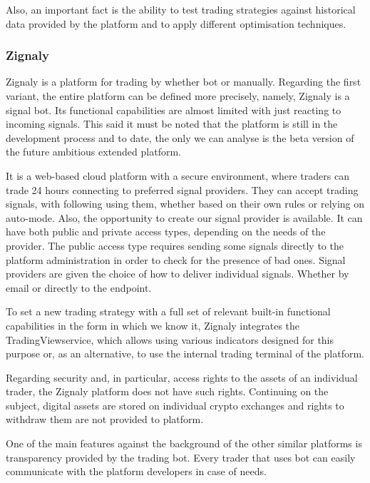 \documentclass[thesis=B,english]{FITthesis}[2019/03/06]
\begin{document}
Also, an important fact is the ability to test trading strategies against historical data provided by the platform and to apply different optimisation techniques.

\subsubsection{Zignaly}
Zignaly is a platform for trading by whether bot or manually. Regarding the first variant, the entire platform can be defined more precisely, namely, Zignaly is a signal bot. Its functional capabilities are almost limited with just reacting to incoming signals. This said it must be noted that the platform is still in the development process and to date, the only we can analyse is the beta version of the future ambitious extended platform.

It is a web-based cloud platform with a secure environment, where traders can trade 24 hours connecting to preferred signal providers. They can accept trading signals, with following using them, whether based on their own rules or relying on auto-mode. Also, the opportunity to create our signal provider is available. It can have both public and private access types, depending on the needs of the provider. The public access type requires sending some signals directly to the platform administration in order to check for the presence of bad ones. Signal providers are given the choice of how to deliver individual signals. Whether by email or directly to the endpoint.

To set a new trading strategy with a full set of relevant built-in functional capabilities in the form in which we know it, Zignaly integrates the TradingView\footnotemark service, which allows using various indicators designed for this purpose or, as an alternative, to use the internal trading terminal of the platform. 


Regarding security and, in particular, access rights to the assets of an individual trader, the Zignaly platform does not have such rights.
Continuing on the subject, digital assets are stored on individual crypto exchanges and rights to withdraw them are not provided to platform.

One of the main features against the background of the other similar platforms is transparency provided by the trading bot. Every trader that uses bot can easily communicate with the platform developers in case of needs.
\end{document}
